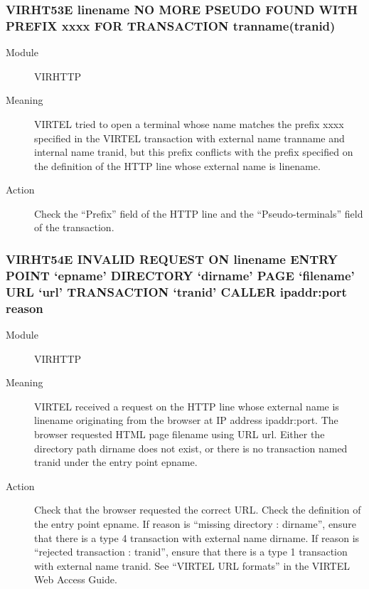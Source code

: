 \documentclass[letterpaper,10pt,english]{sphinxmanual}
\begin{document}
\subsubsection{VIRHT53E linename NO MORE PSEUDO FOUND WITH PREFIX xxxx FOR TRANSACTION tranname(tranid)}
\label{\detokenize{messages:virht53e-linename-no-more-pseudo-found-with-prefix-xxxx-for-transaction-tranname-tranid}}\begin{description}
\item[{Module}] \leavevmode
VIRHTTP

\item[{Meaning}] \leavevmode
VIRTEL tried to open a terminal whose name matches the prefix xxxx specified in the VIRTEL transaction with external name tranname and internal name tranid, but this prefix conflicts with the prefix specified on the definition of the HTTP line whose external name is linename.

\item[{Action}] \leavevmode
Check the “Prefix” field of the HTTP line and the “Pseudo-terminals” field of the transaction.

\end{description}


\subsubsection{VIRHT54E INVALID REQUEST ON linename ENTRY POINT ‘epname’ DIRECTORY ‘dirname’ PAGE ‘filename’ URL ‘url’ TRANSACTION ‘tranid’ CALLER ipaddr:port reason}
\label{\detokenize{messages:virht54e-invalid-request-on-linename-entry-point-epname-directory-dirname-page-filename-url-url-transaction-tranid-caller-ipaddr-port-reason}}\begin{description}
\item[{Module}] \leavevmode
VIRHTTP

\item[{Meaning}] \leavevmode
VIRTEL received a request on the HTTP line whose external name is linename originating from the browser at IP address ipaddr:port. The browser requested HTML page filename using URL url. Either the directory path dirname does not exist, or there is no transaction named tranid under the entry point epname.

\item[{Action}] \leavevmode
Check that the browser requested the correct URL. Check the definition of the entry point epname. If reason is “missing directory : dirname”, ensure that there is a type 4 transaction with external name dirname. If reason is “rejected transaction : tranid”, ensure that there is a type 1 transaction with external name tranid. See “VIRTEL URL formats” in the VIRTEL Web Access Guide.

\end{description}
\end{document}
